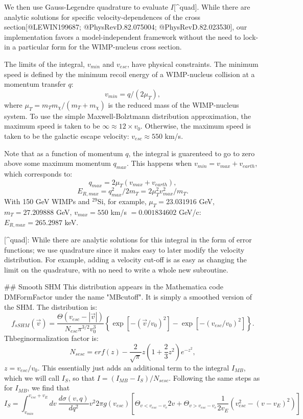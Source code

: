 We then use Gauss-Legendre quadrature to evaluate $I$[^quad]. While there are
analytic solutions for specific velocity-dependences of the cross
section[@LEWIN199687; @PhysRevD.82.075004; @PhysRevD.82.023530], our
implementation favors a model-independent framework without the need to lock-in
a particular form for the WIMP-nucleus cross section. 

The limits of the integral, $v_{min}$ and $v_{esc}$, have physical constraints.
The minimum speed is defined by the minimum recoil energy of a WIMP-nucleus
collision at a momentum transfer $q$: 
\begin{equation} 
v_{min} = q/(2\mu_T),
\end{equation} where
$\mu_T=m_Tm_\chi/(m_T+m_\chi)$ is the reduced mass of the WIMP-nucleus system.
To use the simple Maxwell-Bolztmann distribution approximation, the maximum
speed is taken to be $\infty \approx 12 \times v_{0}$. Otherwise, the maximum
speed is taken to be the galactic escape velocity: $v_{esc} \approx 550$ km/s.

Note that as a function of momentum $q$, the integral is guarenteed to go to
zero above some maximum momentum $q_{max}$. This happens when $v_{min} =
v_{max}+v_{earth}$, which corresponds to:
\begin{equation}
q_{max} = 2\mu_T (v_{max}+v_{earth}),
\end{equation}
\begin{equation}
E_{R,max} = q_{max}^2/2m_T = 2\mu_T^2v_{max}^2/m_T.
\end{equation}
With 150 GeV WIMPs and $^{29}$Si, for example, $\mu_T=23.031916$ GeV,
$m_T=27.209888$ GeV, $v_{max}=550$ km/s $=0.001834602$ GeV/c:
$E_{R,max} = 265.2987$ keV.

[^quad]: While there are analytic solutions for this integral in the form of 
    error functions; we use quadrature since it makes easy to later modify the 
    velocity distribution. For example, adding a velocity cut-off is as easy as
    changing the limit on the quadrature, with no need to write a whole new 
    subroutine.

## Smooth SHM
This distribution appears in the Mathematica code DMFormFactor under the name 
"MBcutoff". It is simply a smoothed version of the SHM. The distribution is:
\begin{equation}
    f_{sSHM}(\vec{v}) = \frac{\Theta(v_{esc}-|\vec{v}|)}
        {N_{esc}\pi^{3/2}v_0^3}
        \left\{\exp[-(\vec{v}/v_0)^2] - \exp[-(v_{esc}/v_0)^2] \right\}.
\end{equation}
Thbeginormalization factor is:
\begin{equation}
    N_{sesc} = erf(z) - \frac{2}{\sqrt{\pi}}z(1+\frac{2}{3}z^2)e^{-z^2},
\end{equation}
$z=v_{esc}/v_0$.
This essentially just adds an additional term to the integral $I_{MB}$, which we
will call $I_{S}$, so that $I=(I_{MB}-I_{S})/N_{sesc}$. Following the same steps
as for $I_{MB}$, we find that 
\begin{equation}
I_{S} = \int_{v_{min}}^{v_{esc}+v_E} dv\ \frac{d\sigma(v,q)}{d{q}^2} v^2 2\pi g(v_{esc})\left[\Theta_{v<v_{esc}-v_e} 2v + \Theta_{v>v_{esc}-v_e} \frac{1}{2v_E}(v_{esc}^2-(v-v_E)^2)\right]
\end{equation}

